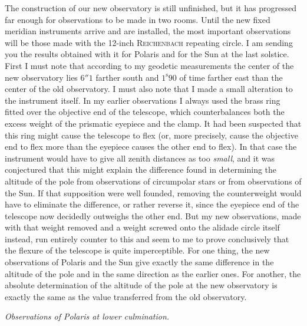 \par\indent The construction of our new observatory is still unfinished, but it has progressed far enough for observations to be made in two rooms. Until the new fixed meridian instruments arrive and are installed, the most important observations will be those made with the 12-inch \textsc{Reichenbach} repeating circle. I am sending you the results obtained with it for Polaris and for the Sun at the last solstice. First I must note that according to my geodetic measurements the center of the new observatory lies $6''1$ farther south and $1^{\mathrm s}90$ of time farther east than the center of the old observatory. I must also note that I made a small alteration to the instrument itself. In my earlier observations I always used the brass ring fitted over the objective end of the telescope, which counterbalances both the excess weight of the prismatic eyepiece and the clamp. It had been suspected that this ring might cause the telescope to flex (or, more precisely, cause the objective end to flex more than the eyepiece causes the other end to flex). In that case the instrument would have to give all zenith distances as too \emph{small}, and it was conjectured that this might explain the difference found in determining the altitude of the pole from observations of circumpolar stars or from observations of the Sun. If that supposition were well founded, removing the counterweight would have to eliminate the difference, or rather reverse it, since the eyepiece end of the telescope now decidedly outweighs the other end. But my new observations, made with that weight removed and a weight screwed onto the alidade circle itself instead, run entirely counter to this and seem to me to prove conclusively that the flexure of the telescope is quite imperceptible. For one thing, the new observations of Polaris and the Sun give exactly the same difference in the altitude of the pole and in the same direction as the earlier ones. For another, the absolute determination of the altitude of the pole at the new observatory is exactly the same as the value transferred from the old observatory.

\par\indent\emph{Observations of Polaris at lower culmination.}

